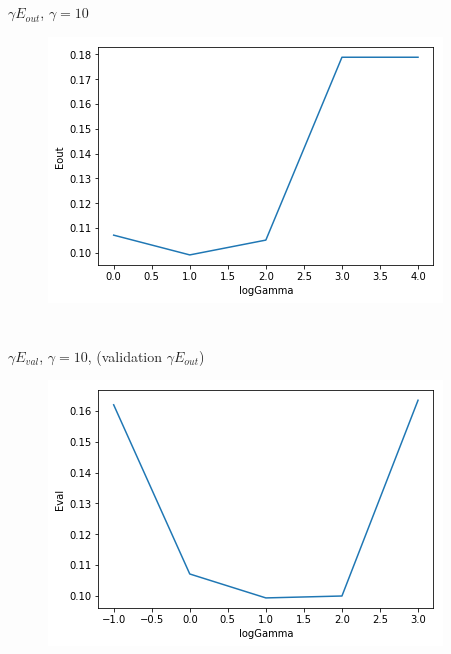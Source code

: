 \documentclass[fleqn,a4paper,12pt]{article}
\begin{document}
\section{} %
{\McQ{}}$\gamma${\MaQ{}}$E_{out}${\MaQ{}}, {\MaQ{}}$\gamma=10${\MbQ{}}\zZ
\begin{figure}[h]
\centering
\includegraphics[scale=0.9]{Q15.png}
\end{figure}

\section{} %
{\McQ{}}$\gamma${\MaQ{}}$E_{val}${\MaQ{}}, {\MaQ{}}$\gamma=10${\MbQ{}}, {\McQ{}}({\MjQ{}}validation {\McQ{}}$\gamma${\MaQ{}}$E_{out}${\MbQ{}})
\begin{figure}[h]
\centering
\includegraphics[scale=0.9]{Q16.png}
\end{figure}
\end{document}
